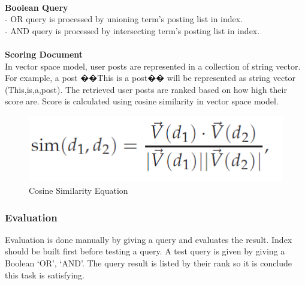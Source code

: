 	\\
	\textbf{Boolean Query}\\
		-  OR query is processed by unioning term’s posting list in index.\\
		-  AND query is processed by intersecting term’s posting list in index.\\
	\\
	\textbf{Scoring Document}\\
	In vector space model, user posts are represented in a collection of string vector. For example, a post ��This is a post�� will be represented as string vector (This,is,a,post).
	The retrieved user posts are ranked based on how high their score are. Score is calculated using cosine similarity in vector space model.\\
	\begin{figure}[h]
		\begin{center}
			\includegraphics[scale=0.4]{images/cosinesim.png}
		\caption{Cosine Similarity Equation\label{cosinesim}}
	\end{center}
	\end{figure}

\subsubsection{Evaluation}
Evaluation is done manually by giving a query and evaluates the result. Index should be built first before testing a query. A test query is given by giving a Boolean ‘OR’, ‘AND’. The query result is listed by their rank so it is conclude this task is satisfying.

